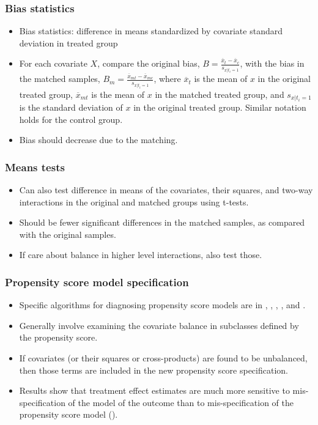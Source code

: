 \documentclass[11pt,titlepage]{article}
\begin{document}
\subsubsection{Bias statistics}
\begin{itemize}
\item Bias statistics: difference in means standardized by covariate
  standard deviation in treated group
\item For each covariate $X$, compare the original bias, $B =
  \frac{\overline{x}_{t}-\overline{x}_{c}}{s_{x|t_i=1}}$, with the
  bias in the matched samples, $B_m =
  \frac{\overline{x}_{mt}-\overline{x}_{mc}}{s_{x|t_i=1}}$, where
  ${\overline{x}_t}$ is the mean of $x$ in the original treated group,
  $\overline{x}_{mt}$ is the mean of $x$ in the matched treated group,
  and $s_{x|t_i=1}$ is the standard deviation of $x$ in the original
  treated group.  Similar notation holds for the control group.
\item Bias should decrease due to the matching.
\end{itemize}

\subsubsection{Means tests}
\begin{itemize}
\item Can also test difference in means of the covariates, their
  squares, and two-way interactions in the original and matched groups
  using t-tests.
\item Should be fewer significant differences in the matched samples,
  as compared with the original samples.
\item If care about balance in higher level interactions, also test
  those.
\end{itemize}

\subsubsection{Propensity score model specification}
\begin{itemize}
\item Specific algorithms for diagnosing propensity score models are
  in \cite{RosRub84}, \cite{Perkins00}, \cite{DehWah02},
  \cite{MicBloHil04}, and \cite{matchitdocs}.
\item Generally involve examining the covariate balance in subclasses
  defined by the propensity score.
\item If covariates (or their squares or cross-products) are found to
  be unbalanced, then those terms are included in the new propensity
  score specification.
\item Results show that treatment effect estimates are much more
  sensitive to mis-specification of the model of the outcome than to
  mis-specification of the propensity score model (\cite{Drake93,
    DehWah99, DehWah02, Zhao04}).
\end{itemize}
\end{document}

